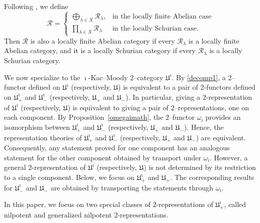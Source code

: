 \documentclass[a4,10pt]{amsart}
\numberwithin{equation}{section}
\theoremstyle{definition}
\begin{document}
Following  \cite{BSW-heisenberg}, {we} define 
\begin{equation}
\label{affm} \mathcal R=\begin{cases}  \bigoplus_{\lambda\in X } \mathcal R_\lambda, & \text{in the locally finite Abelian case} \\
\prod_{\lambda\in X} \mathcal R_\lambda & \text{in the locally Schurian case.}\end{cases} \end{equation} 
Then $\mathcal R$ is also  a locally finite Abelian category if every $\mathcal R_\lambda$ is a locally finite Abelian category, and it is a locally Schurian category if every  $\mathcal R_\lambda $ is a locally Schurian category. 

We now specialize to the $\imath$-Kac--Moody $2$--category $\mathfrak U^\imath$. By \eqref{decomp1}, a $2$--functor defined on $\mathfrak U^\imath$ (respectively, $\mathfrak U$) is  equivalent to a pair of $2$-functors defined on $\mathfrak U^\imath_+$ and $\mathfrak U^\imath_-$ (respectively, $\mathfrak U_+$ and $\mathfrak U_-$). In particular, giving a $2$-representation of $\mathfrak U^\imath$ (respectively, $\mathfrak U$) is equivalent to giving a pair of $2$--representations, one on each component. By Proposition~\ref{omegaimath}, the $2$--functor $\omega_\imath$ provides an isomorphism between $\mathfrak U^\imath_+$ and $\mathfrak U^\imath_-$ (respectively, $\mathfrak U_+$ and $\mathfrak U_-$). Hence, the representation theories of $\mathfrak U^\imath_+$ and $\mathfrak U^\imath_-$ (respectively, $\mathfrak U_+$ and $\mathfrak U_-$) are equivalent. Consequently, any statement proved for one component has  an analogous statement for the other component obtained by transport under $\omega_\imath$. However, a general \(2\)-representation of
\(\mathfrak U^\imath\) (respectively, $\mathfrak U$) is not determined by its restriction to a single
component. Below,  we focus on \(\mathfrak U^\imath_+\) and $\mathfrak U_+$. The corresponding
results for \(\mathfrak U_-^\imath\) and $\mathfrak U_-$ are obtained by transporting the
statements through $\omega_\imath$. 

 In this paper, we focus on two special classes of $2$-representations of $\mathfrak U^\imath_+$, called  nilpotent and generalized nilpotent 2-representations.
\end{document}
